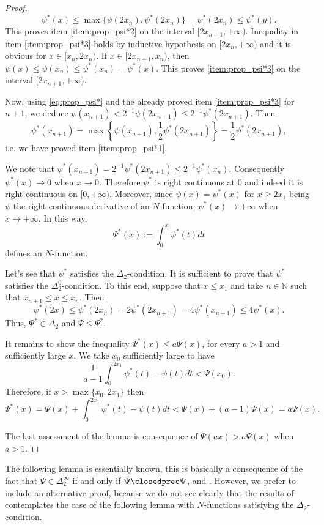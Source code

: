 \documentclass[twoside]{article}
\theoremstyle{remark}
\renewcommand{\leq}{\leqslant}
\renewcommand{\geq}{\geqslant}
\begin{document}
\begin{proof}
\[\psi^*(x)\leq\max\{\psi(2x_n),\psi^*(2x_n)\}=\psi^*(2x_n)\leq\psi^*(y).\]
This proves item \ref{item:prop_psi*2} on the interval $[2x_{n+1},+\infty)$.
Inequality in item \ref{item:prop_psi*3} holds by inductive hypothesis on $[2x_n,+\infty)$ 
and it is obvious for  $x\in[x_n,2x_n)$. 
If $ x\in[2x_{n+1},x_n)$, then $\psi(x)\leq\psi(x_n)\leq\psi^*(x_n)=\psi^*(x)$. 
This proves  \ref{item:prop_psi*3} on the interval $[2x_{n+1},+\infty)$.

Now, using \eqref{eq:prop_psi*} and the already proved item \ref{item:prop_psi*3} for $n+1$, we deduce $\psi(x_{n+1})<2^{-1}\psi(2x_{n+1})\leq 2^{-1}\psi^*(2x_{n+1})$.
Then
\[\psi^*(x_{n+1})=\max\left\{\psi(x_{n+1}),\frac12\psi^*(2x_{n+1}) \right\}=\frac12\psi^*(2x_{n+1}),\]
i.e. we have proved item \ref{item:prop_psi*1}.

We note that $\psi^*(x_{n+1})=2^{-1}\psi^*(2x_{n+1})\leq 2^{-1}\psi^*(x_{n})$. Consequently $\psi^*(x)\to 0$ when $x\to 0$.
Therefore $\psi^*$ is right continuous at $0$ and indeed it is right continuous on $[0,+\infty)$. 
Moreover, since $\psi(x)=\psi^*(x)$ for $x\geq 2x_1$ being $\psi$ the right continuous derivative of an $N$-function, $\psi^*(x)\to +\infty$ when $x\to +\infty$. In this way,
\[\Psi^*(x):=\int_0^x\psi^*(t)dt\]
defines an $N$-function.

Let's see that $\psi^*$ satisfies the $\Delta_2$-condition.
It is sufficient to prove that $\psi^*$ satisfies the $ \Delta_2^0$-condition. 
To this end, suppose that  $x\leq x_1$ and take $n\in\mathbb{N}$ such that $x_{n+1}\leq x\leq x_n$. Then
\[\psi^*(2x)\leq \psi^*(2x_n)=2\psi^*(2x_{n+1})=4\psi^*(x_{n+1})\leq 4\psi^*(x).\]
Thus,  $\Psi^* \in  \Delta_2$ and $\Psi\leq \Psi^*$.

It remains to show the inequality $\Psi^*(x)\leq a\Psi(x)$, 
for every $a>1$ and sufficiently large $x$. We take $x_0$ sufficiently large to have
\[\frac{1}{a-1}\int_0^{2x_1}\psi^*(t)-\psi(t)dt<\Psi(x_0).\]
Therefore, if  $x>\max\{x_0,2x_1\}$ then
\[\Psi^*(x)=\Psi(x)+\int_0^{2x_1}\psi^*(t)-\psi(t)dt<\Psi(x)+(a-1)\Psi(x)= a\Psi(x).\]

The last assessment of the lemma is consequence of   $\Psi(ax)>a\Psi(x)$ when $a>1$. 

\end{proof}



The following lemma is essentially known,  this is basically a consequence  of the fact that $\Psi\in\Delta_2^{\infty}$ if and only if $\Psi\closedprec\Psi$,  \cite[Prop. 4, p. 20]{rao1991theory} and \cite[Cor. 10, p. 30]{rao1991theory}. 
However, we prefer to include an alternative proof, because we do not see clearly that the results of \cite{rao1991theory} contemplates the case of the following lemma with $N$-functions satisfying the $\Delta_2$-condition.
\end{document}
